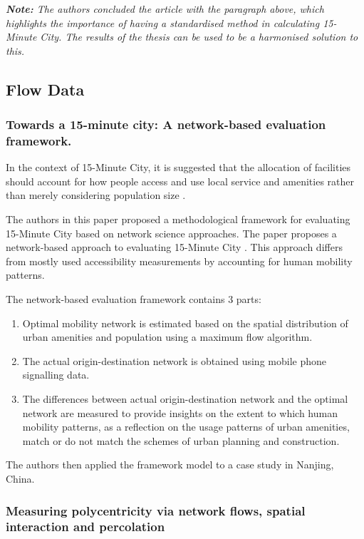 \textit{\textbf{Note:} The authors concluded the article with the paragraph above, which highlights the importance of having a standardised method in calculating 15-Minute City. The results of the thesis can be used to be a harmonised solution to this.}

\subsection{Flow Data}

\subsubsection{Towards a 15-minute city: A network-based evaluation framework.} 

In the context of 15-Minute City, it is suggested that the allocation of facilities should account for how people access and use local service and amenities rather than merely considering population size \cite{chai_new_2020}.

The authors in this paper proposed a methodological framework for evaluating 15-Minute City based on network science approaches. The paper proposes a network-based approach to evaluating 15-Minute City \cite{zhang_towards_2023}. This approach differs from mostly used accessibility measurements by accounting for human mobility patterns.

The network-based evaluation framework contains 3 parts:

\begin{enumerate}
    \item Optimal mobility network is estimated based on the spatial distribution of urban amenities and population using a maximum flow algorithm.
    \item The actual origin-destination network is obtained using mobile phone signalling data.
    \item The differences between actual origin-destination network and the optimal network are measured to provide insights on the extent to which human mobility patterns, as a reflection on the usage patterns of urban amenities, match or do not match the schemes of urban planning and construction.
\end{enumerate}

The authors then applied the framework model to a case study in Nanjing, China.

\subsubsection{Measuring polycentricity via network flows, spatial interaction and percolation}

